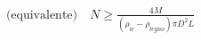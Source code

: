 \documentclass[preview]{standalone}
\begin{document}
\begin{align*}
\text{(equivalente)}\quad N \ge \frac{4M}{(\rho_w-\rho_{legno})\pi D^2 L}
\end{align*}
\end{document}
